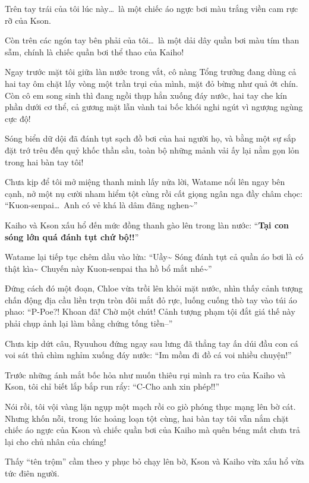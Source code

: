 \documentclass[../main.tex]{subfiles}
\begin{document}
Trên tay trái của tôi lúc này\dots\ là một chiếc áo ngực bơi màu trắng viền cam rực rỡ của Kson.

Còn trên các ngón tay bên phải của tôi\dots\ là một dải dây quần bơi màu tím than sẫm, chính là chiếc quần bơi thể thao của Kaiho!

Ngay trước mặt tôi giữa làn nước trong vắt, cô nàng Tổng trưởng đang dùng cả hai tay ôm chặt lấy vòng một trần trụi của mình, mặt đỏ bừng như quả ớt chín. Còn cô em song sinh thì đang ngồi thụp hẳn xuống đáy nước, hai tay che kín phần dưới cơ thể, cả gương mặt lẫn vành tai bốc khói nghi ngút vì ngượng ngùng cực độ!

Sóng biển dữ dội đã đánh tụt sạch đồ bơi của hai người họ, và bằng một sự sắp đặt trớ trêu đến quỷ khốc thần sầu, toàn bộ những mảnh vải ấy lại nằm gọn lỏn trong hai bàn tay tôi!

Chưa kịp để tôi mở miệng thanh minh lấy nửa lời, Watame nổi lên ngay bên cạnh, nở một nụ cười nham hiểm tột cùng rồi cất giọng ngân nga đầy châm chọc: ``Kuon-senpai\dots\ Anh có vẻ khá là dâm đãng nghen\~{}''

Kaiho và Kson xấu hổ đến mức đồng thanh gào lên trong làn nước: ``\textbf{Tại con sóng lớn quá đánh tụt chứ bộ!!}''

Watame lại tiếp tục chêm dầu vào lửa: ``Uầy\~{} Sóng đánh tụt cả quần áo bơi là có thật kìa\~{} Chuyến này Kuon-senpai tha hồ bổ mắt nhé\~{}''

Đứng cách đó một đoạn, Chloe vừa trồi lên khỏi mặt nước, nhìn thấy cảnh tượng chấn động địa cầu liền trợn tròn đôi mắt đỏ rực, luống cuống thò tay vào túi áo phao: ``P-Poe?! Khoan đã! Chờ một chút! Cảnh tượng phạm tội đắt giá thế này phải chụp ảnh lại làm bằng chứng tống tiền--''

Chưa kịp dứt câu, Ryuuhou đứng ngay sau lưng đã thẳng tay ấn dúi đầu con cá voi sát thủ chìm nghỉm xuống đáy nước: ``Im mồm đi đồ cá voi nhiều chuyện!''

Trước những ánh mắt bốc hỏa như muốn thiêu rụi mình ra tro của Kaiho và Kson, tôi chỉ biết lắp bắp run rẩy: ``C-Cho anh xin phép!!''

Nói rồi, tôi vội vàng lặn ngụp một mạch rồi co giò phóng thục mạng lên bờ cát. Nhưng khốn nỗi, trong lúc hoảng loạn tột cùng, hai bàn tay tôi vẫn nắm chặt chiếc áo ngực của Kson và chiếc quần bơi của Kaiho mà quên béng mất chưa trả lại cho chủ nhân của chúng!

Thấy ``tên trộm'' cầm theo y phục bỏ chạy lên bờ, Kson và Kaiho vừa xấu hổ vừa tức điên người.
\end{document}
